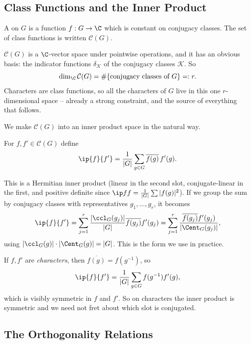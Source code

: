 \subsection{Class Functions and the Inner Product}

\begin{definition}
	A  on $G$ is a function $f : G \to \C$ which is constant on conjugacy classes. The set of class functions is written $\mathcal{C}(G)$.
\end{definition}

$\mathcal{C}(G)$ is a $\C$-vector space under pointwise operations, and it has an obvious basis: the indicator functions $\delta_{\mathcal{K}}$ of the conjugacy classes $\mathcal{K}$. So
$$\dim_\C \mathcal{C}(G) = \#\{\text{conjugacy classes of } G\} =: r.$$
Characters are class functions, so all the characters of $G$ live in this one $r$-dimensional space -- already a strong constraint, and the source of everything that follows.

We make $\mathcal{C}(G)$ into an inner product space in the natural way.

\begin{definition}
	For $f, f' \in \mathcal{C}(G)$ define
	$$\ip{f}{f'} = \frac{1}{|G|}\sum_{g \in G} \overline{f(g)}\, f'(g).$$
\end{definition}

This is a Hermitian inner product (linear in the second slot, conjugate-linear in the first, and positive definite since $\ip ff = \frac1{|G|}\sum|f(g)|^2$). If we group the sum by conjugacy classes with representatives $g_1, \dots, g_r$, it becomes
$$\ip{f}{f'} = \sum_{j=1}^r \frac{|\ccl_G(g_j)|}{|G|}\overline{f(g_j)}f'(g_j) = \sum_{j=1}^r \frac{\overline{f(g_j)}f'(g_j)}{|\Cent_G(g_j)|},$$
using $|\ccl_G(g)| \cdot |\Cent_G(g)| = |G|$. This is the form we use in practice.

\begin{remark}
	If $f, f'$ are \emph{characters}, then $\overline{f(g)} = f(g^{-1})$, so
	$$\ip{f}{f'} = \frac{1}{|G|}\sum_{g\in G} f(g^{-1})f'(g),$$
	which is visibly symmetric in $f$ and $f'$. So on characters the inner product is symmetric and we need not fret about which slot is conjugated.
\end{remark}

\subsection{The Orthogonality Relations}

